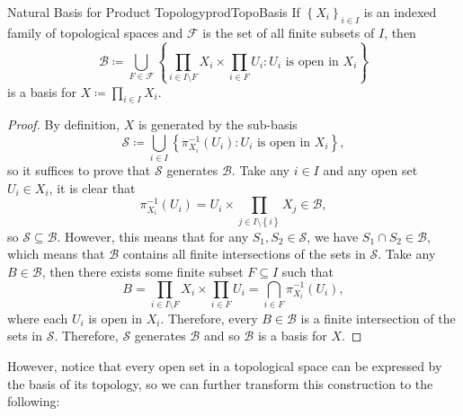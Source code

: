 \documentclass[math]{amznotes}
\theoremstyle{remark}
\begin{document}
\begin{probox}{Natural Basis for Product Topology}{prodTopoBasis}
    If $\left\{X_i\right\}_{i \in I}$ is an indexed family of topological spaces and $\mathcal{F}$ is the set of all finite subsets of $I$, then 
    \begin{equation*}
        \mathcal{B} \coloneqq \bigcup_{F \in \mathcal{F}}\left\{\prod_{i \in I \setminus F}X_i \times \prod_{i \in F}U_i \colon U_i \textrm{ is open in } X_i\right\}
    \end{equation*}
    is a basis for $X \coloneqq \prod_{i \in I}X_i$.
    \tcblower
    \begin{proof}
        By definition, $X$ is generated by the sub-basis 
        \begin{equation*}
            \mathcal{S} \coloneqq \bigcup_{i \in I}\left\{\pi_{X_i}^{-1}\left(U_i\right) \colon U_i \textrm{ is open in } X_i\right\},
        \end{equation*}
        so it suffices to prove that $\mathcal{S}$ generates $\mathcal{B}$. Take any $i \in I$ and any open set $U_i \in X_i$, it is clear that 
        \begin{equation*}
            \pi_{X_i}^{-1}\left(U_i\right) = U_i \times \prod_{j \in I \setminus \left\{i\right\}} X_j \in \mathcal{B},
        \end{equation*}
        so $\mathcal{S} \subseteq \mathcal{B}$. However, this means that for any $S_1, S_2 \in \mathcal{S}$, we have $S_1 \cap S_2 \in \mathcal{B}$, which means that $\mathcal{B}$ contains all finite intersections of the sets in $\mathcal{S}$. Take any $B \in \mathcal{B}$, then there exists some finite subset $F \subseteq I$ such that 
        \begin{equation*}
            B = \prod_{i \in I \setminus F}X_i \times \prod_{i \in F}U_i = \bigcap_{i \in F}\pi_{X_i}^{-1}\left(U_i\right),
        \end{equation*}
        where each $U_i$ is open in $X_i$. Therefore, every $B \in \mathcal{B}$ is a finite intersection of the sets in $\mathcal{S}$. Therefore, $\mathcal{S}$ generates $\mathcal{B}$ and so $\mathcal{B}$ is a basis for $X$.
    \end{proof}
\end{probox}
However, notice that every open set in a topological space can be expressed by the basis of its topology, so we can further transform this construction to the following:
\end{document}
